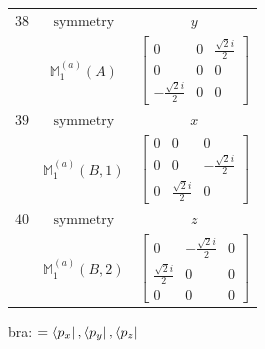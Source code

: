 \documentclass[fleqn,8pt,landscape]{jsarticle}
\begin{document}
\begin{longtable}{ccc}
$ 38 $ & $ \text{symmetry} $ & $ y $ \\
$  $ & $ \mathbb{M}_{1}^{(a)}(A) $ & $ \begin{bmatrix} 0 & 0 & \frac{\sqrt{2} i}{2} \\ 0 & 0 & 0 \\ - \frac{\sqrt{2} i}{2} & 0 & 0 \end{bmatrix} $ \\ \hline
$ 39 $ & $ \text{symmetry} $ & $ x $ \\
$  $ & $ \mathbb{M}_{1}^{(a)}(B,1) $ & $ \begin{bmatrix} 0 & 0 & 0 \\ 0 & 0 & - \frac{\sqrt{2} i}{2} \\ 0 & \frac{\sqrt{2} i}{2} & 0 \end{bmatrix} $ \\ \hline
$ 40 $ & $ \text{symmetry} $ & $ z $ \\
$  $ & $ \mathbb{M}_{1}^{(a)}(B,2) $ & $ \begin{bmatrix} 0 & - \frac{\sqrt{2} i}{2} & 0 \\ \frac{\sqrt{2} i}{2} & 0 & 0 \\ 0 & 0 & 0 \end{bmatrix} $ \\ \hline
\end{longtable}
bra: $=\bra{p_{x}}, \bra{p_{y}}, \bra{p_{z}}$
\end{document}
